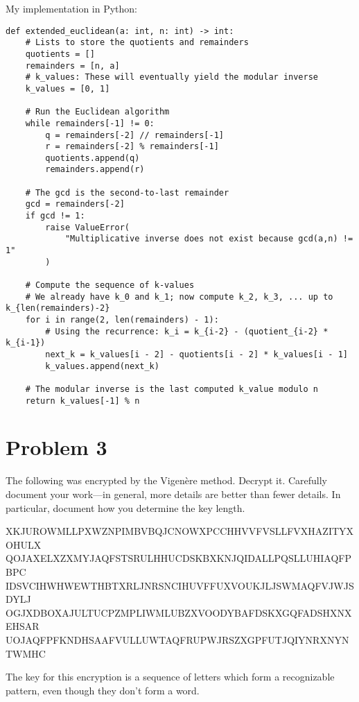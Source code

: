 \documentclass[12pt]{article}
\begin{document}
My implementation in Python:
\begin{lstlisting}[style=python]
def extended_euclidean(a: int, n: int) -> int:
    # Lists to store the quotients and remainders
    quotients = []
    remainders = [n, a]
    # k_values: These will eventually yield the modular inverse
    k_values = [0, 1]

    # Run the Euclidean algorithm
    while remainders[-1] != 0:
        q = remainders[-2] // remainders[-1]
        r = remainders[-2] % remainders[-1]
        quotients.append(q)
        remainders.append(r)

    # The gcd is the second-to-last remainder
    gcd = remainders[-2]
    if gcd != 1:
        raise ValueError(
            "Multiplicative inverse does not exist because gcd(a,n) != 1"
        )

    # Compute the sequence of k-values
    # We already have k_0 and k_1; now compute k_2, k_3, ... up to k_{len(remainders)-2}
    for i in range(2, len(remainders) - 1):
        # Using the recurrence: k_i = k_{i-2} - (quotient_{i-2} * k_{i-1})
        next_k = k_values[i - 2] - quotients[i - 2] * k_values[i - 1]
        k_values.append(next_k)

    # The modular inverse is the last computed k_value modulo n
    return k_values[-1] % n
\end{lstlisting}

\newpage
\section*{Problem 3}
The following was encrypted by the Vigenère method. Decrypt it. Carefully document your work—in general, more details are better than fewer details. In particular, document how you determine the key length.

\begin{center}
XKJUROWMLLPXWZNPIMBVBQJCNOWXPCCHHVVFVSLLFVXHAZITYXOHULX\\
QOJAXELXZXMYJAQFSTSRULHHUCDSKBXKNJQIDALLPQSLLUHIAQFPBPC\\
IDSVCIHWHWEWTHBTXRLJNRSNCIHUVFFUXVOUKJLJSWMAQFVJWJSDYLJ\\
OGJXDBOXAJULTUCPZMPLIWMLUBZXVOODYBAFDSKXGQFADSHXNXEHSAR\\
UOJAQFPFKNDHSAAFVULLUWTAQFRUPWJRSZXGPFUTJQIYNRXNYNTWMHC
\end{center}

The key for this encryption is a sequence of letters which form a recognizable pattern, even though they don't form a word.
\end{document}
